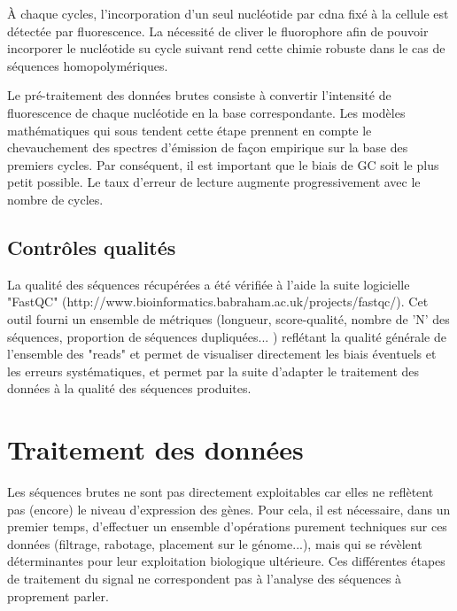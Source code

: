 \documentclass[../main.tex]{subfiles}
\begin{document}
À chaque cycles, l'incorporation d'un seul nucléotide par \gls{cdna} fixé à la cellule est détectée par fluorescence.
La nécessité de cliver le fluorophore afin de pouvoir incorporer le nucléotide su cycle suivant rend cette chimie robuste dans le cas de séquences homopolymériques.
\par
Le pré-traitement des données brutes consiste à convertir l'intensité de fluorescence de chaque nucléotide en la base correspondante.
Les modèles mathématiques qui sous tendent cette étape prennent en compte le chevauchement des spectres d'émission de façon empirique sur la base des premiers cycles.
Par conséquent, il est important que le biais de GC soit le plus petit possible.
Le taux d'erreur de lecture augmente progressivement avec le nombre de cycles.

\subsection{Contrôles qualités}
La qualité des séquences récupérées a été vérifiée à l'aide la suite logicielle "FastQC" (http://www.bioinformatics.babraham.ac.uk/projects/fastqc/).
Cet outil fourni un ensemble de métriques (longueur, score-qualité, nombre de 'N' des séquences, proportion de séquences dupliquées... ) reflétant la qualité générale de l'ensemble des "reads" et permet de visualiser directement les biais éventuels et les erreurs systématiques, et permet par la suite d'adapter le traitement des données à la qualité des séquences produites.




\section{Traitement des données}
Les séquences brutes ne sont pas directement exploitables car elles ne reflètent pas (encore) le niveau d'expression des gènes.
Pour cela, il est nécessaire, dans un premier temps, d'effectuer un ensemble d'opérations purement techniques sur ces données (filtrage, rabotage, placement sur le génome...), mais qui se révèlent déterminantes pour leur exploitation biologique ultérieure.
Ces différentes étapes de traitement du signal ne correspondent pas à l'analyse des séquences à proprement parler. 
\end{document}
